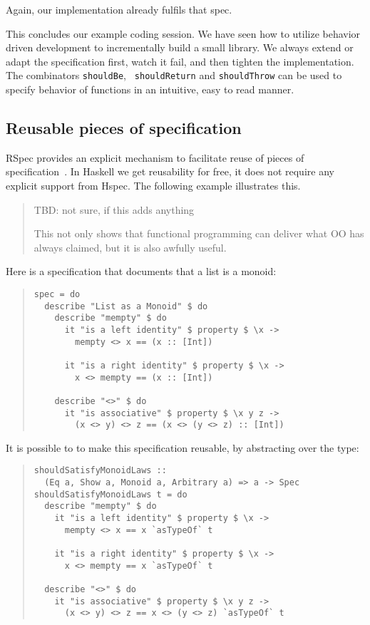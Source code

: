 \documentclass[preprint]{sigplanconf}
\begin{document}
\noindent Again, our implementation already fulfils that spec.

This concludes our example coding session.  We have seen how to utilize
behavior driven development to incrementally build a small library.
We always extend or adapt the specification first, watch it fail,  and
then tighten the implementation.  The combinators {\tt shouldBe}, {\tt
shouldReturn} and {\tt shouldThrow} can be used to specify behavior of
functions in an intuitive, easy to read manner.

\subsection{Reusable pieces of specification}
\label{sec:reusable-specs}

RSpec provides an explicit mechanism to facilitate reuse of pieces of
specification~\cite{rspec}.
In Haskell we get reusability for free, it does not require any
explicit support from Hspec.
The following example illustrates this.

\begin{quote}
  TBD: not sure, if this adds anything

This not only shows that functional programming can deliver what OO
has always claimed, but it is also awfully useful.
\end{quote}
Here is a specification that documents that a list is a monoid:

\begin{quote}
\small
\begin{verbatim}
spec = do
  describe "List as a Monoid" $ do
    describe "mempty" $ do
      it "is a left identity" $ property $ \x ->
        mempty <> x == (x :: [Int])

      it "is a right identity" $ property $ \x ->
        x <> mempty == (x :: [Int])

    describe "<>" $ do
      it "is associative" $ property $ \x y z ->
        (x <> y) <> z == (x <> (y <> z) :: [Int])
\end{verbatim}
\end{quote}

\noindent It is possible to to make this specification reusable, by
abstracting over the type:

\begin{quote}
\small
\begin{verbatim}
shouldSatisfyMonoidLaws ::
  (Eq a, Show a, Monoid a, Arbitrary a) => a -> Spec
shouldSatisfyMonoidLaws t = do
  describe "mempty" $ do
    it "is a left identity" $ property $ \x ->
      mempty <> x == x `asTypeOf` t

    it "is a right identity" $ property $ \x ->
      x <> mempty == x `asTypeOf` t

  describe "<>" $ do
    it "is associative" $ property $ \x y z ->
      (x <> y) <> z == x <> (y <> z) `asTypeOf` t
\end{verbatim}
\end{quote}
\end{document}
